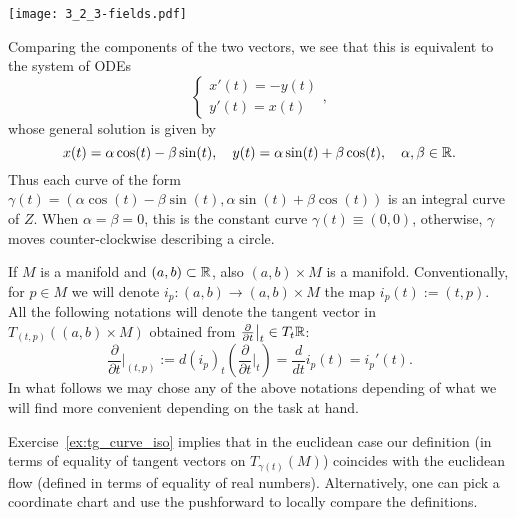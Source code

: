 \begin{example}
\begin{equation}
  \end{equation}
  \begin{marginfigure}
    \texttt{[image: 3\_2\_3-fields.pdf]}
  \end{marginfigure}
  \noindent Comparing the components of the two vectors, we see that this is equivalent to the system of ODEs
  \begin{equation}
    \begin{cases}
      x'(t) = - y(t) \\
      y'(t) = x(t)
    \end{cases},
  \end{equation}
  whose general solution is given by
  \begin{equation}
    x(t) = \alpha\cos(t) - \beta\sin(t), \quad
    y(t) = \alpha\sin(t) + \beta\cos(t), \quad \alpha,\beta\in\mathbb{R}.
  \end{equation}
  Thus each curve of the form $\gamma(t) = (\alpha\cos(t) -  \beta\sin(t), \alpha\sin(t) + \beta\cos(t))$ is an integral curve of $Z$.
  When $\alpha=\beta=0$, this is the constant curve $\gamma(t)\equiv (0,0)$, otherwise, $\gamma$ moves counter-clockwise describing a circle.
\end{example}

\begin{notation}
  If $M$ is a manifold and $(a,b)\subset\mathbb{R}$, also $(a,b)\times M$ is a manifold.
  Conventionally, for $p\in M$ we will denote $i_p : (a,b) \to (a,b)\times M$ the map $i_p(t) := (t,p)$.
  All the following notations will denote the tangent vector in $T_{(t,p)}((a,b)\times M)$ obtained from $\frac{\partial}{\partial t}\big|_t \in T_t\mathbb{R}$:
  \begin{equation}
    \frac{\partial}{\partial t}\Big|_{(t,p)} := d (i_p)_t\left(\frac{\partial}{\partial t}\Big|_t\right) = \frac{d}{d t}  i_p(t) = i_p'(t).
  \end{equation}
  In what follows we may chose any of the above notations depending of what we will find more convenient depending on the task at hand.
\end{notation}

Exercise~\ref{ex:tg_curve_iso} implies that in the euclidean case our definition (in terms of equality of tangent vectors on $T_{\gamma(t)}(M)$) coincides with the euclidean flow (defined in terms of equality of real numbers).
Alternatively, one can pick a coordinate chart and use the pushforward to locally compare the definitions.

